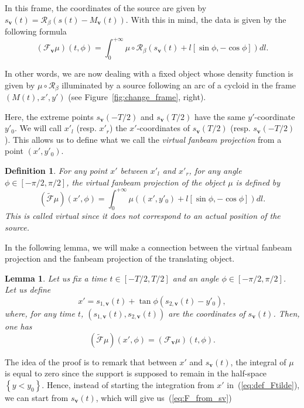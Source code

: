 \documentclass[twocolumn]{IEEEtran}
\numberwithin{equation}{section}
\newcommand{\bv}{\mathbf{v}}
\newcommand{\Mbv}{M_{\mathbf{v}}}
\newcommand{\Tbv}{\mathcal{F}_{\mathbf{v}}}
\newcommand{\sbv}{s_{\mathbf{v}}}
\newtheorem{definition}{Definition}
\newtheorem{lemma}{Lemma}
\begin{document}
In this frame, the coordinates of the source are given by $\sbv(t)=\mathcal{R}_{\beta} \left( s(t)-\Mbv(t) \right)$. With this in mind, the data is given by the following formula
\begin{equation}
	(\Tbv\mu)(t,\phi) = \int_0^{+\infty} \mu \circ \mathcal{R}_{\beta} \left( s_{\bv}(t) + l \left[ \sin \phi, -\cos \phi \right] \right) dl.
\label{eq:F_from_sv}
\end{equation}

In other words, we are now dealing with a fixed object whose density function is given by $\mu \circ \mathcal{R}_{\beta}$ illuminated by a source following an arc of a cycloid in the frame $\left(M(t), x', y'\right)$ (see Figure~\ref{fig:change_frame}, right).

Here, the extreme points $\sbv(-T/2)$ and $\sbv(T/2)$ have the same $y'$-coordinate $y'_0$. We will call $x'_l$ (resp. $x'_r$) the $x'$-coordinates of $\sbv(T/2)$ (resp. $\sbv(-T/2)$). This allows us to define what we call the \emph{virtual fanbeam projection} from a point $(x',y'_0)$.
\begin{definition}
	For any point $x'$ between $x'_l$ and $x'_r$, for any angle $\phi \in \left[ -\pi/2, \pi/2\right]$, the \emph{virtual fanbeam projection} of the object $\mu$ is defined by
\begin{equation}
	\left( \tilde{\mathcal{F}}\mu	\right)(x',\phi) = \int_0^{+\infty} \mu \left( (x',y'_0) + l \left[ \sin \phi, -\cos \phi \right] \right) dl.
\label{eq:def_Ftilde}
\end{equation}
This is called \emph{virtual} since it does not correspond to an actual position of the source.
\end{definition}

In the following lemma, we will make a connection between the virtual fanbeam projection and the fanbeam projection of the translating object.
\begin{lemma}
	Let us fix a time $t \in \left[ -T/2, T/2\right]$ and an angle $\phi \in \left[ -\pi/2, \pi/2\right]$. Let us define
	\begin{equation}
		x' = s_{1,\bv}(t) + \tan \phi \left( s_{2,\bv}(t) - y'_0 \right),
	\end{equation}
	where, for any time $t$, $\left( s_{1,\bv}(t), s_{2,\bv}(t) \right)$ are the coordinates of $\sbv(t)$.
	Then, one has
	\begin{equation}
		\left( \tilde{\mathcal{F}}\mu \right)(x',\phi) = \left( \Tbv \mu \right)(t,\phi).
	\end{equation}
\label{lem:T_x_t}
\end{lemma}
The idea of the proof is to remark that between $x'$ and $\sbv(t)$, the integral of $\mu$ is equal to zero since the support is supposed to remain in the half-space $\left\{ y<y_0 \right\}$. Hence, instead of starting the integration from $x'$ in~(\ref{eq:def_Ftilde}), we can start from $\sbv(t)$, which will give us~(\ref{eq:F_from_sv})
\end{document}
